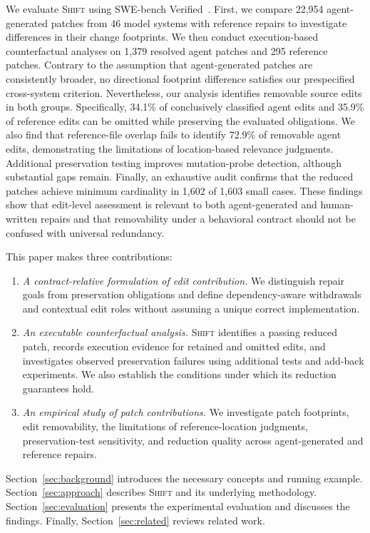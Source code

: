 \documentclass[a4paper,fleqn]{cas-sc}
\newcommand{\tool}{\textsc{Shift}}
\begin{document}
We evaluate \tool{} using SWE-bench Verified~\citep{jimenez2024swebench,chowdhury2024verified}. First, we compare 22,954 agent-generated patches from 46 model systems with reference repairs to investigate differences in their change footprints. We then conduct execution-based counterfactual analyses on 1,379 resolved agent patches and 295 reference patches. Contrary to the assumption that agent-generated patches are consistently broader, no directional footprint difference satisfies our prespecified cross-system criterion. Nevertheless, our analysis identifies removable source edits in both groups. Specifically, 34.1\% of conclusively classified agent edits and 35.9\% of reference edits can be omitted while preserving the evaluated obligations. We also find that reference-file overlap fails to identify 72.9\% of removable agent edits, demonstrating the limitations of location-based relevance judgments. Additional preservation testing improves mutation-probe detection, although substantial gaps remain. Finally, an exhaustive audit confirms that the reduced patches achieve minimum cardinality in 1,602 of 1,603 small cases. These findings show that edit-level assessment is relevant to both agent-generated and human-written repairs and that removability under a behavioral contract should not be confused with universal redundancy.

This paper makes three contributions:
\begin{enumerate}
\item \emph{A contract-relative formulation of edit contribution.} We distinguish repair goals from preservation obligations and define dependency-aware withdrawals and contextual edit roles without assuming a unique correct implementation.
\item \emph{An executable counterfactual analysis.} \tool{} identifies a passing reduced patch, records execution evidence for retained and omitted edits, and investigates observed preservation failures using additional tests and add-back experiments. We also establish the conditions under which its reduction guarantees hold.
\item \emph{An empirical study of patch contributions.} We investigate patch footprints, edit removability, the limitations of reference-location judgments, preservation-test sensitivity, and reduction quality across agent-generated and reference repairs.
\end{enumerate}

Section~\ref{sec:background} introduces the necessary concepts and running example. Section~\ref{sec:approach} describes \tool{} and its underlying methodology. Section~\ref{sec:evaluation} presents the experimental evaluation and discusses the findings. Finally, Section~\ref{sec:related} reviews related work.
\end{document}
